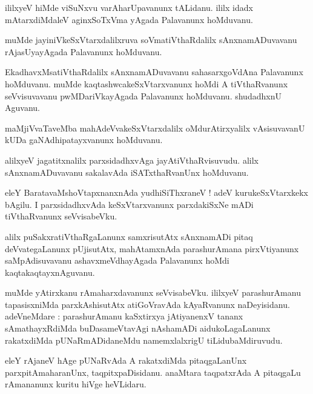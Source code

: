 \documentclass{article}
\begin{document}
\begin{mn}
ililxyeV hiMde viSuNxvu varAharUpavanunx tALidanu. ililx idadx mAtarxdiMdaleV aginxSoTxVma yAgada 
Palavanunx hoMduvanu.
\end{mn}

\begin{mn}
muMde jayiniVkeSxVtarxdalilxruva soVmatiVthaRdalilx sAnxnamADuvavanu rAjasUyayAgada Palavanunx 
hoMduvanu.
\end{mn}

\begin{mn}
EkadhavxMsatiVthaRdalilx sAnxnamADuvavanu sahasarxgoVdAna Palavanunx hoMduvanu. muMde 
kaqtashwcakeSxVtarxvanunx  hoMdi A tiVthaRvanunx seVvisuvavanu pwMDariVkayAgada Palavanunx 
hoMduvanu. shudadhxnU Aguvanu.
\end{mn}

\begin{mn}
maMjiVvaTaveMba mahAdeVvakeSxVtarxdalilx oMdurAtirxyalilx vAsisuvavanU kUDa gaNAdhipatayxvanunx 
hoMduvanu.
\end{mn}

\begin{mn}
alilxyeV jagatitxnalilx parxsidadhxvAga jayAtiVthaRvisuvudu. alilx sAnxnamADuvavanu sakalavAda 
iSATxthaRvanUnx hoMduvanu.
\end{mn}

\begin{mn}
eleY BaratavaMshoVtapxnanxnAda yudhiSiThxraneV ! adeV kurukeSxVtarxkekx bAgilu. I parxsidadhxvAda 
keSxVtarxvanunx parxdakiSxNe mADi tiVthaRvanunx  seVvisabeVku.
\end{mn}

\begin{mn}
alilx puSakxratiVthaRgaLanunx samxrisutAtx sAnxnamADi pitaq deVvategaLanunx  pUjisutAtx, 
mahAtamxnAda  parashurAmana pirxVtiyanunx saMpAdisuvavanu ashavxmeVdhayAgada Palavanunx hoMdi 
kaqtakaqtayxnAguvanu.
\end{mn}

\begin{mn}
muMde yAtirxkanu rAmaharxdavanunx seVvisabeVku. ililxyeV parashurAmanu tapasisxniMda parxkAshisutAtx
atiGoVravAda kAyaRvanunx naDeyisidanu. adeVneMdare : parashurAmanu kaSxtirxya jAtiyanenxV tananx 
sAmathayxRdiMda buDasameVtavAgi nAshamADi aidukoLagaLanunx rakatxdiMda pUNaRmADidaneMdu 
namemxlalxrigU tiLidubaMdiruvudu.
\end{mn}

\begin{mn}
eleY rAjaneV hAge pUNaRvAda A rakatxdiMda pitaqgaLanUnx parxpitAmaharanUnx, taqpitxpaDisidanu. 
anaMtara taqpatxrAda A pitaqgaLu rAmananunx kuritu hiVge heVLidaru.
\end{mn}
\end{document}
